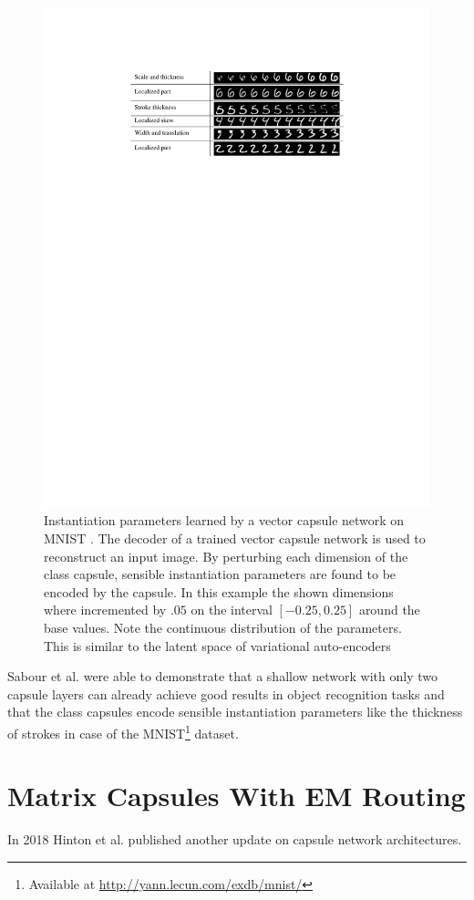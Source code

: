 \begin{figure}
    \centering
    \includegraphics[width=.8\textwidth]{figures/vector-capsules-parameters.pdf}
\caption[Instantiation parameters learned by a vector capsule network on MNIST]{Instantiation parameters learned by a vector capsule network on MNIST \cite{sabour2017dynamic}. The decoder of a trained vector capsule network is used to reconstruct an input image. By perturbing each dimension of the class capsule, sensible instantiation parameters are found to be encoded by the capsule. In this example the shown dimensions where incremented by $\num{.05}$ on the interval $[\num{-0.25}, \num{0.25}]$ around the base values. Note the continuous distribution of the parameters. This is similar to the latent space of variational auto-encoders \cite{kingma2013auto} }\label{fig:vector-capsules-parameters}
\end{figure}\noindent
Sabour et al. were able to demonstrate that a shallow network with only two capsule layers can already achieve good results in object recognition tasks and that the class capsules encode sensible instantiation parameters like the thickness of strokes in case of the MNIST\footnote{Available at \url{http://yann.lecun.com/exdb/mnist/}} dataset.
\section{Matrix Capsules With EM Routing}
In 2018 Hinton et al. published another update on capsule network architectures. 